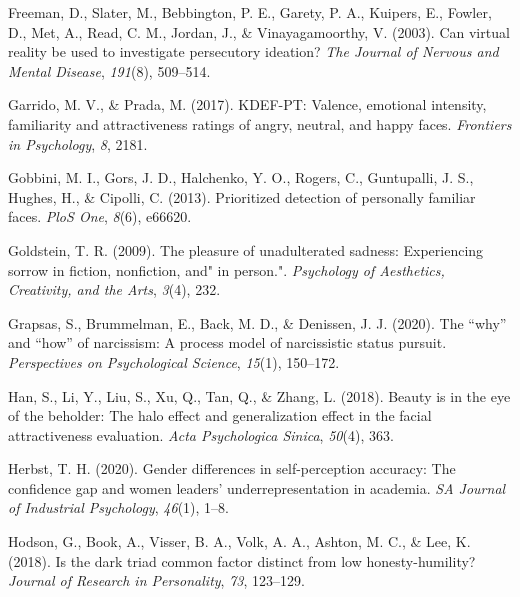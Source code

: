 \documentclass[
  man,mask,floatsintext]{apa6}
\newlength{\cslhangindent}
\newlength{\cslentryspacingunit} %
\newenvironment{CSLReferences}[2] %
 {%
  \setlength{\parindent}{0pt}
  \ifodd #1
  \let\oldpar\par
  \def\par{\hangindent=\cslhangindent\oldpar}
  \fi
  \setlength{\parskip}{#2\cslentryspacingunit}
 }%
 {}
\begin{document}
\begin{CSLReferences}{1}{0}
\leavevmode{}%
Freeman, D., Slater, M., Bebbington, P. E., Garety, P. A., Kuipers, E., Fowler, D., Met, A., Read, C. M., Jordan, J., \& Vinayagamoorthy, V. (2003). Can virtual reality be used to investigate persecutory ideation? \emph{The Journal of Nervous and Mental Disease}, \emph{191}(8), 509--514.

\leavevmode{}%
Garrido, M. V., \& Prada, M. (2017). KDEF-PT: Valence, emotional intensity, familiarity and attractiveness ratings of angry, neutral, and happy faces. \emph{Frontiers in Psychology}, \emph{8}, 2181.

\leavevmode{}%
Gobbini, M. I., Gors, J. D., Halchenko, Y. O., Rogers, C., Guntupalli, J. S., Hughes, H., \& Cipolli, C. (2013). Prioritized detection of personally familiar faces. \emph{PloS One}, \emph{8}(6), e66620.

\leavevmode{}%
Goldstein, T. R. (2009). The pleasure of unadulterated sadness: Experiencing sorrow in fiction, nonfiction, and" in person.". \emph{Psychology of Aesthetics, Creativity, and the Arts}, \emph{3}(4), 232.

\leavevmode{}%
Grapsas, S., Brummelman, E., Back, M. D., \& Denissen, J. J. (2020). The {``why''} and {``how''} of narcissism: A process model of narcissistic status pursuit. \emph{Perspectives on Psychological Science}, \emph{15}(1), 150--172.

\leavevmode{}%
Han, S., Li, Y., Liu, S., Xu, Q., Tan, Q., \& Zhang, L. (2018). Beauty is in the eye of the beholder: The halo effect and generalization effect in the facial attractiveness evaluation. \emph{Acta Psychologica Sinica}, \emph{50}(4), 363.

\leavevmode{}%
Herbst, T. H. (2020). Gender differences in self-perception accuracy: The confidence gap and women leaders' underrepresentation in academia. \emph{SA Journal of Industrial Psychology}, \emph{46}(1), 1--8.

\leavevmode{}%
Hodson, G., Book, A., Visser, B. A., Volk, A. A., Ashton, M. C., \& Lee, K. (2018). Is the dark triad common factor distinct from low honesty-humility? \emph{Journal of Research in Personality}, \emph{73}, 123--129.


\end{CSLReferences}
\end{document}
